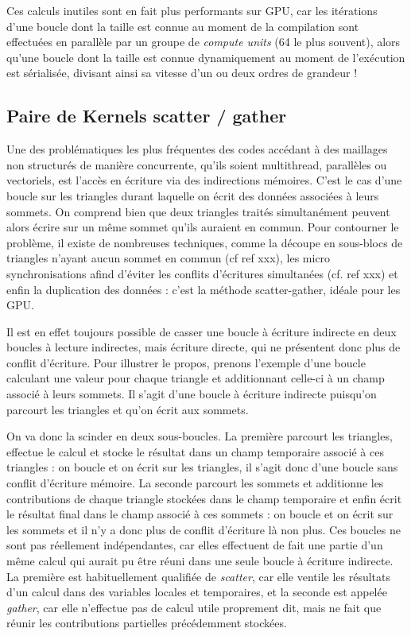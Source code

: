 \documentclass[a4paper,12pt]{article}
\begin{document}
Ces calculs inutiles sont en fait plus performants sur GPU, car les itérations d'une boucle dont la taille est connue au moment de la compilation sont effectuées en parallèle par un groupe de \emph{compute units} (64 le plus souvent), alors qu'une boucle dont la taille est connue dynamiquement au moment de l'exécution est sérialisée, divisant ainsi sa vitesse d'un ou deux ordres de grandeur !


\subsection{Paire de Kernels scatter / gather}
Une des problématiques les plus fréquentes des codes accédant à des maillages non structurés de manière concurrente, qu'ils soient multithread, parallèles ou vectoriels, est l'accès en écriture via des indirections mémoires.
C'est le cas d'une boucle sur les triangles durant laquelle on écrit des données associées à leurs sommets.
On comprend bien que deux triangles traités simultanément peuvent alors écrire sur un même sommet qu'ils auraient en commun.
Pour contourner le problème, il existe de nombreuses techniques, comme la découpe en sous-blocs de triangles n'ayant aucun sommet en commun (cf ref xxx), les micro synchronisations afind d'éviter les conflits d'écritures simultanées (cf. ref xxx) et enfin la duplication des données : c'est la méthode scatter-gather, idéale pour les GPU.

Il est en effet toujours possible de casser une boucle à écriture indirecte en deux boucles à lecture indirectes, mais écriture directe, qui ne présentent donc plus de conflit d'écriture.
Pour illustrer le propos, prenons l'exemple d'une boucle calculant une valeur pour chaque triangle et additionnant celle-ci à un champ associé à leurs sommets.
Il s'agit d'une boucle à écriture indirecte puisqu'on parcourt les triangles et qu'on écrit aux sommets.

On va donc la scinder en deux sous-boucles.
La première parcourt les triangles, effectue le calcul et stocke le résultat dans un champ temporaire associé à ces triangles : on boucle et on écrit sur les triangles, il s'agit donc d'une boucle sans conflit d'écriture mémoire.
La seconde parcourt les sommets et additionne les contributions de chaque triangle stockées dans le champ temporaire et enfin écrit le résultat final dans le champ associé à ces sommets : on boucle et on écrit sur les sommets et il n'y a donc plus de conflit d'écriture là non plus.
Ces boucles ne sont pas réellement indépendantes, car elles effectuent de fait une partie d'un même calcul qui aurait pu être réuni dans une seule boucle à écriture indirecte.
La première est habituellement qualifiée de \emph{scatter}, car elle ventile les résultats d'un calcul dans des variables locales et temporaires, et la seconde est appelée \emph{gather}, car elle n'effectue pas de calcul utile proprement dit, mais ne fait que réunir les contributions partielles précédemment stockées.
\end{document}
